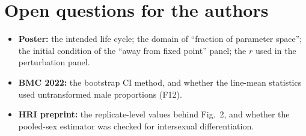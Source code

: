 \section{Open questions for the authors}
\begin{itemize}
\item \textbf{Poster:} the intended life cycle; the domain of ``fraction of parameter space''; the initial condition of the ``away from fixed point'' panel; the $r$ used in the perturbation panel.
\item \textbf{BMC 2022:} the bootstrap CI method, and whether the line-mean statistics used untransformed male proportions (F12).
\item \textbf{HRI preprint:} the replicate-level values behind Fig.\ 2, and whether the pooled-sex estimator was checked for intersexual differentiation.
\end{itemize}
